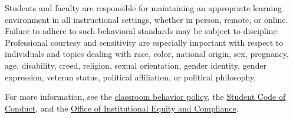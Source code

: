 \item[Classroom Behavior:] 
Students and faculty are responsible for maintaining an appropriate learning environment in all instructional settings, whether in person, remote, or online. 
Failure to adhere to such behavioral standards may be subject to discipline. 
Professional courtesy and sensitivity are especially important with respect to individuals and topics dealing with race, color, national origin, sex, pregnancy, age, disability, creed, religion, sexual orientation, gender identity, gender expression, veteran status, political affiliation, or political philosophy.
  
For more information, see the \href{http://www.colorado.edu/policies/student-classroom-and-course-related-behavior}{classroom behavior policy}, the \href{https://www.colorado.edu/sccr/student-conduct}{Student Code of Conduct}, and the \href{https://www.colorado.edu/oiec/}{Office of Institutional Equity and Compliance}. 

 


